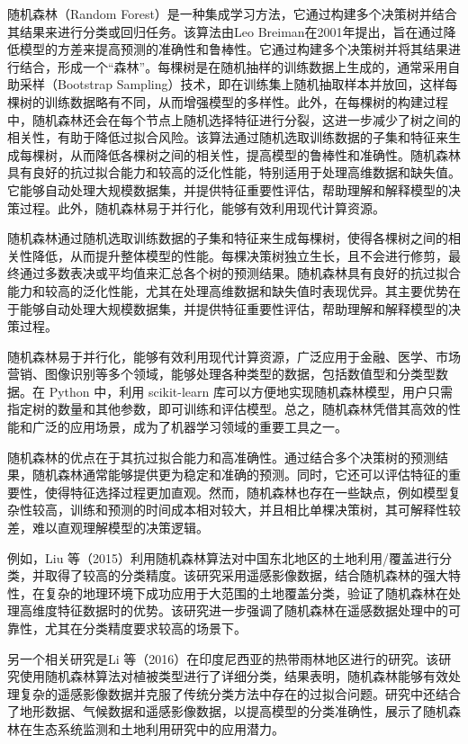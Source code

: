 \documentclass[AutoFakeBold]{LZUThesis-PgD&PhD}
\begin{document}
	随机森林（Random Forest）是一种集成学习方法，它通过构建多个决策树并结合其结果来进行分类或回归任务。该算法由Leo Breiman在2001年提出，旨在通过降低模型的方差来提高预测的准确性和鲁棒性。它通过构建多个决策树并将其结果进行结合，形成一个“森林”。每棵树是在随机抽样的训练数据上生成的，通常采用自助采样（Bootstrap Sampling）技术，即在训练集上随机抽取样本并放回，这样每棵树的训练数据略有不同，从而增强模型的多样性。此外，在每棵树的构建过程中，随机森林还会在每个节点上随机选择特征进行分裂，这进一步减少了树之间的相关性，有助于降低过拟合风险。该算法通过随机选取训练数据的子集和特征来生成每棵树，从而降低各棵树之间的相关性，提高模型的鲁棒性和准确性。随机森林具有良好的抗过拟合能力和较高的泛化性能，特别适用于处理高维数据和缺失值。它能够自动处理大规模数据集，并提供特征重要性评估，帮助理解和解释模型的决策过程。此外，随机森林易于并行化，能够有效利用现代计算资源。
	
	随机森林通过随机选取训练数据的子集和特征来生成每棵树，使得各棵树之间的相关性降低，从而提升整体模型的性能。每棵决策树独立生长，且不会进行修剪，最终通过多数表决或平均值来汇总各个树的预测结果。随机森林具有良好的抗过拟合能力和较高的泛化性能，尤其在处理高维数据和缺失值时表现优异。其主要优势在于能够自动处理大规模数据集，并提供特征重要性评估，帮助理解和解释模型的决策过程。
	
	随机森林易于并行化，能够有效利用现代计算资源，广泛应用于金融、医学、市场营销、图像识别等多个领域，能够处理各种类型的数据，包括数值型和分类型数据。在 Python 中，利用 scikit-learn 库可以方便地实现随机森林模型，用户只需指定树的数量和其他参数，即可训练和评估模型。总之，随机森林凭借其高效的性能和广泛的应用场景，成为了机器学习领域的重要工具之一。
	
	随机森林的优点在于其抗过拟合能力和高准确性。通过结合多个决策树的预测结果，随机森林通常能够提供更为稳定和准确的预测。同时，它还可以评估特征的重要性，使得特征选择过程更加直观。然而，随机森林也存在一些缺点，例如模型复杂性较高，训练和预测的时间成本相对较大，并且相比单棵决策树，其可解释性较差，难以直观理解模型的决策逻辑。
	
	例如，Liu 等（2015）利用随机森林算法对中国东北地区的土地利用/覆盖进行分类，并取得了较高的分类精度。该研究采用遥感影像数据，结合随机森林的强大特性，在复杂的地理环境下成功应用于大范围的土地覆盖分类，验证了随机森林在处理高维度特征数据时的优势\cite{liu2015}。该研究进一步强调了随机森林在遥感数据处理中的可靠性，尤其在分类精度要求较高的场景下。
	
	另一个相关研究是Li 等（2016）在印度尼西亚的热带雨林地区进行的研究。该研究使用随机森林算法对植被类型进行了详细分类，结果表明，随机森林能够有效处理复杂的遥感影像数据并克服了传统分类方法中存在的过拟合问题\cite{li2016}。研究中还结合了地形数据、气候数据和遥感影像数据，以提高模型的分类准确性，展示了随机森林在生态系统监测和土地利用研究中的应用潜力。
	
\end{document}
